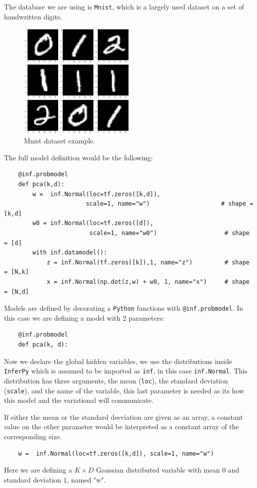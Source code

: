   The database we are using is \texttt{Mnist}, which is a largely used dataset on a set of handwritten digits.

\begin{figure}[h!]
    \centering
    \includegraphics[width=0.5\textwidth]{Chapters/InferPy/images/mnist.png}
    \caption{Mnist dataset example.}
\end{figure}

The full model definition would be the following:
\begin{verbatim}
    @inf.probmodel
    def pca(k,d):
        w =  inf.Normal(loc=tf.zeros([k,d]),
                       scale=1, name="w")                    # shape = [k,d]
        w0 = inf.Normal(loc=tf.zeros([d]),
                        scale=1, name="w0")                   # shape = [d]
        with inf.datamodel():
            z = inf.Normal(tf.zeros([k]),1, name="z")         # shape = [N,k]
            x = inf.Normal(np.dot(z,w) + w0, 1, name="x")     # shape = [N,d]
\end{verbatim}

Models are defined by decorating a \texttt{Python} functions with \texttt{@inf.probmodel}. In this case we are defining a model with 2 parameters:

\begin{verbatim}
    @inf.probmodel
    def pca(k, d):
\end{verbatim}

Now we declare the global hidden variables, we use the distributions inside \texttt{InferPy} which is assumed to be imported as \texttt{inf}, in this case \texttt{inf.Normal}. This distribution has three arguments, the mean (\texttt{loc}), the standard deviation (\texttt{scale}), and the name of the variable, this last parameter is needed as its how this model and the variational will communicate.

If either the mean or the standard desviation are given as an array, a constant value on the other parameter would be interpreted as a constant array of the corresponding size.
\begin{verbatim}
    w =  inf.Normal(loc=tf.zeros([k,d]), scale=1, name="w")                   
\end{verbatim}
Here we are defining a \( K\times D \)  Gaussian distributed variable with mean \( 0 \) and standard deviation \( 1 \), named "w".

